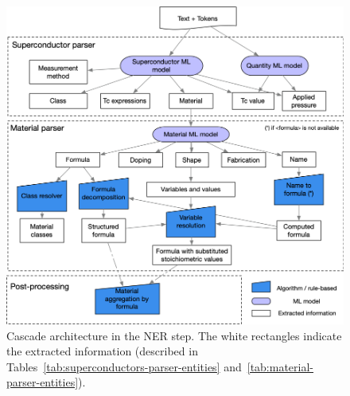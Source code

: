 \documentclass[]{interact}
\theoremstyle{plain}%
\theoremstyle{definition}
\theoremstyle{remark}
\begin{document}
\begin{figure}[ht]
    \includegraphics[width=\textwidth]{schema-extraction-colors}
    \caption{\label{fig:extraction-ml-models-cascade-architecture} Cascade architecture in the NER step. The white rectangles indicate the extracted information (described in Tables~\ref{tab:superconductors-parser-entities} and~\ref{tab:material-parser-entities}).}
\end{figure}
\end{document}

